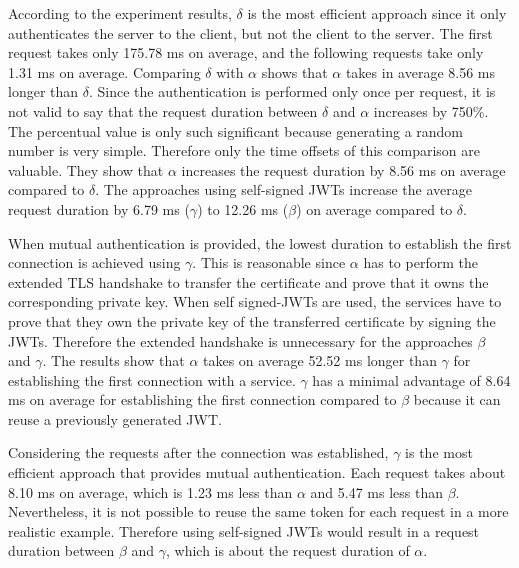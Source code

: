 According to the experiment results, $\delta$ is the most efficient approach since it only authenticates the server to the client, but not the client to the server.
The first request takes only 175.78 ms on average, and the following requests take only 1.31 ms on average.
Comparing $\delta$ with $\alpha$ shows that $\alpha$ takes in average 8.56 ms longer than $\delta$.
Since the authentication is performed only once per request, it is not valid to say that the request duration between $\delta$ and $\alpha$ increases by 750\%.
The percentual value is only such significant because generating a random number is very simple.
Therefore only the time offsets of this comparison are valuable.
They show that $\alpha$ increases the request duration by 8.56 ms on average compared to $\delta$.
The approaches using self-signed JWTs increase the average request duration by 6.79 ms ($\gamma$) to 12.26 ms ($\beta$) on average compared to $\delta$. 

When mutual authentication is provided, the lowest duration to establish the first connection is achieved using $\gamma$.
This is reasonable since $\alpha$ has to perform the extended TLS handshake to transfer the certificate and prove that it owns the corresponding private key.
When self signed-JWTs are used, the services have to prove that they own the private key of the transferred certificate by signing the JWTs.
Therefore the extended handshake is unnecessary for the approaches $\beta$ and $\gamma$.
The results show that $\alpha$ takes on average 52.52 ms longer than $\gamma$ for establishing the first connection with a service.
$\gamma$ has a minimal advantage of 8.64 ms on average for establishing the first connection compared to $\beta$ because it can reuse a previously generated JWT.

Considering the requests after the connection was established, $\gamma$ is the most efficient approach that provides mutual authentication.
Each request takes about 8.10 ms on average, which is 1.23 ms less than $\alpha$ and 5.47 ms less than $\beta$.
Nevertheless, it is not possible to reuse the same token for each request in a more realistic example.
Therefore using self-signed JWTs would result in a request duration between $\beta$ and $\gamma$, which is about the request duration of $\alpha$.

